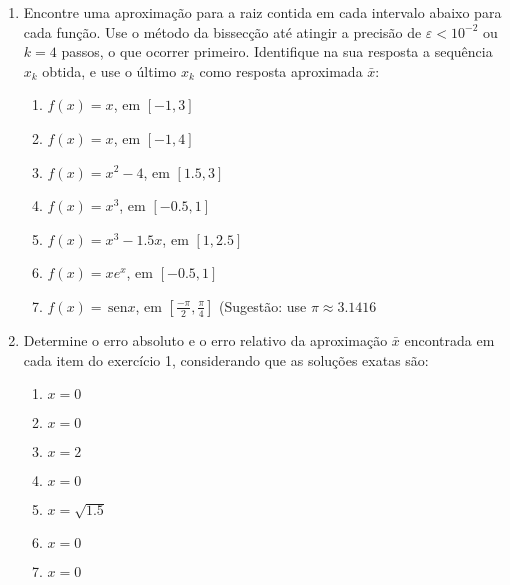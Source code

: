 \documentclass[a4paper]{article}
\providecommand{\sin}{} \renewcommand{\sin}{\hspace{2pt}\mathrm{sen}}
\begin{document}
\begin{enumerate}
\item Encontre uma aproximação para a raiz contida em cada intervalo
  abaixo para cada função. Use o método da bissecção até atingir a
  precisão de $\varepsilon<10^{-2}$ ou $k=4$ passos, o que ocorrer
  primeiro. Identifique na sua resposta a sequência $x_k$ obtida, e
  use o último $x_k$ como resposta aproximada $\bar{x}$:

  \begin{enumerate}
  \item $f(x) = x$, em $[-1, 3]$
  \item $f(x) = x$, em $[-1, 4]$
  \item $f(x) = x^2 - 4$, em $[1.5, 3]$
  \item $f(x) = x^3$, em $[-0.5, 1]$
  \item $f(x) = x^3-1.5x$, em $[1, 2.5]$
  \item $f(x) = x e^x$, em $[-0.5, 1]$
  \item $f(x) = \sin x$, em
    $\left[\frac{-\pi}{2},\frac{\pi}{4}\right]$ (Sugestão: use $\pi
    \approx 3.1416$
  \end{enumerate}

\item Determine o erro absoluto e o erro relativo da aproximação
  $\bar{x}$ encontrada em cada item do exercício 1, considerando que
  as soluções exatas são:
  \begin{enumerate}
  \item $x=0$ %
  \item $x=0$ %
  \item $x=2$ %
  \item $x=0$ %
  \item $x=\sqrt{1.5}$ %
  \item $x=0$ %
  \item $x=0$ %
  \end{enumerate}



\end{enumerate}
\end{document}
